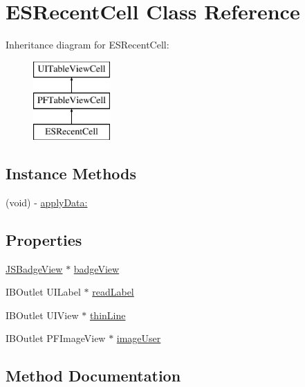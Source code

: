 \hypertarget{interface_e_s_recent_cell}{}\section{E\+S\+Recent\+Cell Class Reference}
\label{interface_e_s_recent_cell}
Inheritance diagram for E\+S\+Recent\+Cell\+:\begin{figure}[H]
\begin{center}
\leavevmode
\includegraphics[height=3.000000cm]{interface_e_s_recent_cell}
\end{center}
\end{figure}
\subsection*{Instance Methods}
\begin{DoxyCompactItemize}
\item 
(void) -\/ \hyperlink{interface_e_s_recent_cell_a2bf905fd6b043a0d902cd9cb7e27117d}{apply\+Data\+:}
\end{DoxyCompactItemize}
\subsection*{Properties}
\begin{DoxyCompactItemize}
\item 
\hyperlink{interface_j_s_badge_view}{J\+S\+Badge\+View} $\ast$ \hyperlink{interface_e_s_recent_cell_a75849020312f522349741e170d82cf8c}{badge\+View}
\item 
I\+B\+Outlet U\+I\+Label $\ast$ \hyperlink{interface_e_s_recent_cell_aa3b5c8f99f21172bf77a45729281fb0d}{read\+Label}
\item 
I\+B\+Outlet U\+I\+View $\ast$ \hyperlink{interface_e_s_recent_cell_afde07a2962344ebf4fcea0c26677510e}{thin\+Line}
\item 
I\+B\+Outlet P\+F\+Image\+View $\ast$ \hyperlink{interface_e_s_recent_cell_a96b9c0a70a1fe4a4e78f4c97b88c2fb7}{image\+User}
\end{DoxyCompactItemize}


\subsection{Method Documentation}
\hypertarget{interface_e_s_recent_cell_a2bf905fd6b043a0d902cd9cb7e27117d}{}
